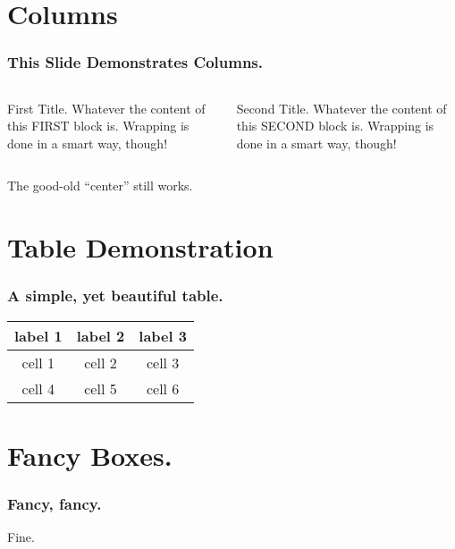 \documentclass[9pt,aspectratio=169]{beamer}
\begin{document}
\section{Columns}
\begin{frame}
    \frametitle{This Slide Demonstrates Columns.}

    \begin{columns}
        \begin{column}[]{.5\textwidth}
            \begin{block}{First Title.}
                Whatever the content of this FIRST block is. Wrapping is done in a smart way, though!
            \end{block}
        \end{column}

        \begin{column}[]{.5\textwidth}
            \begin{block}{Second Title.}
                Whatever the content of this SECOND block is. Wrapping is done in a smart way, though!
            \end{block}
        \end{column}
    \end{columns}

    \begin{center}
        The good-old ``center'' still works.
    \end{center}
\end{frame}

\section{Table Demonstration}
\begin{frame}
    \frametitle{A simple, yet beautiful table.}
    \begin{center}
        \begin{tabular}{c|c|c}
            \toprule
            label 1 & label 2 & label 3 \\
            \midrule
            cell 1 & cell 2 & cell 3 \\
            cell 4 & cell 5 & cell 6 \\
            \bottomrule
        \end{tabular}
    \end{center}
\end{frame}

\section{Fancy Boxes.}
\begin{frame}
    \frametitle{Fancy, fancy.}
\end{frame}

\begin{frame}
    Fine.
\end{frame}
\end{document}
